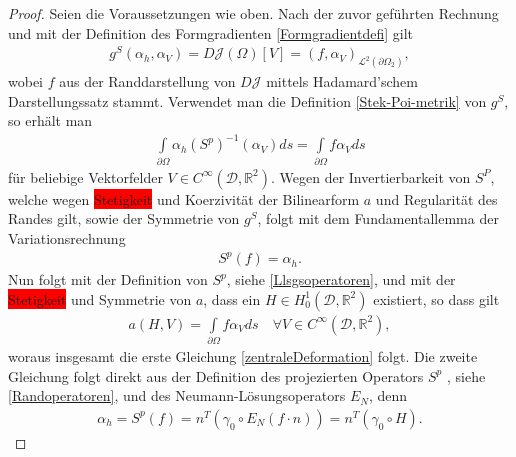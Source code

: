 \begin{proof}
Seien die Voraussetzungen wie oben. Nach der zuvor geführten Rechnung und mit der Definition des Formgradienten \ref{Formgradientdefi} gilt
\begin{align*}
	g^S(\alpha_h, \alpha_V) = D\mathcal{J}(\Omega)[V] = (f,\alpha_V)_{\mathcal{L}^2(\partial\Omega_2)},
\end{align*}
wobei $f$ aus der Randdarstellung von $D\mathcal{J}$ mittels Hadamard'schem Darstellungssatz stammt. Verwendet man die Definition \ref{Stek-Poi-metrik} von $g^S$, so erhält man
\begin{align*}
	\underset{\partial\Omega}{\int} \alpha_h (S^p)^{-1}(\alpha_V)ds = 				\underset{\partial\Omega}{\int} f \alpha_V ds
\end{align*}
für beliebige Vektorfelder $V\in C^\infty(\mathcal{D}, \mathbb{R}^2)$. Wegen der Invertierbarkeit von $S^P$, welche wegen \colorbox{red}{Stetigkeit} und Koerzivität der Bilinearform $a$ und Regularität des Randes gilt, sowie der Symmetrie von $g^S$, folgt mit dem Fundamentallemma der Variationsrechnung
\begin{align*}
	S^p(f) = \alpha_h.
\end{align*}
Nun folgt mit der Definition von $S^p$, siehe \ref{Llsgsoperatoren}, und mit der \colorbox{red}{Stetigkeit} und Symmetrie von $a$, dass ein $H \in H^1_0(\mathcal{D},\mathbb{R}^2)$ existiert, so dass gilt
\begin{align*}
	a(H,V) = \underset{\partial\Omega}{\int} f \alpha_V ds \quad \forall V\in C^\infty(\mathcal{D},\mathbb{R}^2),
\end{align*}
woraus insgesamt die erste Gleichung \ref{zentraleDeformation} folgt. Die zweite Gleichung folgt direkt aus der Definition des projezierten Operators $S^p$ , siehe \ref{Randoperatoren}, und des Neumann-Lösungsoperators $E_N$, denn
\begin{align*}
	\alpha_h = S^p(f) = n^T(\gamma_0\circ E_N(f\cdot n)) = n^T(\gamma_0 \circ H).
\end{align*}
\end{proof}

